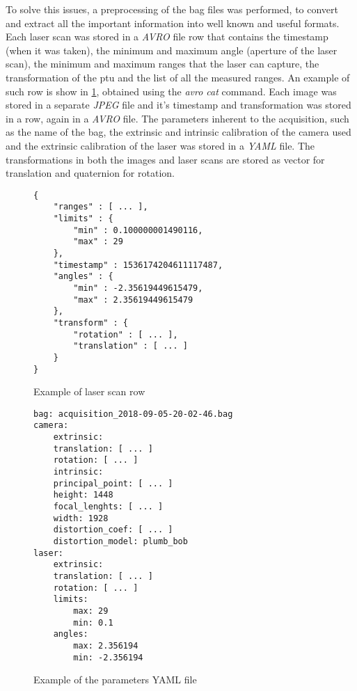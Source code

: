 To solve this issues, a preprocessing of the bag files was performed, to convert and extract all the important information into well known and useful formats. Each laser scan was stored in a \emph{AVRO} file row that contains the timestamp (when it was taken), the minimum and maximum angle (aperture of the laser scan), the minimum and maximum ranges that the laser can capture, the transformation of the ptu and the list of all the measured ranges. An example of such row is show in \cref{figure:laserscan-row}, obtained using the \emph{avro cat} command. Each image was stored in a separate \emph{JPEG} file and it's timestamp and transformation was stored in a row, again in a \emph{AVRO} file. The parameters inherent to the acquisition, such as the name of the bag, the extrinsic and intrinsic calibration of the camera used and the extrinsic calibration of the laser was stored in a \emph{YAML} file. The transformations in both the images and laser scans are stored as vector for translation and quaternion for rotation.

\begin{figure}
    
    \begin{Verbatim}[frame=single]
{
    "ranges" : [ ... ],
    "limits" : {
        "min" : 0.100000001490116,
        "max" : 29
    },
    "timestamp" : 1536174204611117487,
    "angles" : {
        "min" : -2.35619449615479,
        "max" : 2.35619449615479
    },
    "transform" : {
        "rotation" : [ ... ],
        "translation" : [ ... ]
    }
}
    \end{Verbatim}

    \caption{Example of laser scan row}
\label{figure:laserscan-row}
\end{figure}

\begin{figure}

    \begin{Verbatim}[frame=single]
bag: acquisition_2018-09-05-20-02-46.bag
camera:
    extrinsic:
    translation: [ ... ]
    rotation: [ ... ]
    intrinsic:
    principal_point: [ ... ]
    height: 1448
    focal_lenghts: [ ... ]
    width: 1928
    distortion_coef: [ ... ]
    distortion_model: plumb_bob
laser:
    extrinsic:
    translation: [ ... ]
    rotation: [ ... ]
    limits:
        max: 29
        min: 0.1
    angles:
        max: 2.356194
        min: -2.356194
    \end{Verbatim}

    \caption{Example of the parameters YAML file}

\end{figure}

